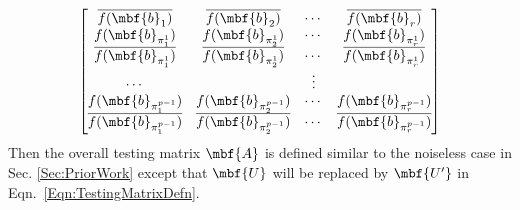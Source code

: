 \documentclass[conference,twocolumn]{IEEEtran}
\begin{document}
{\begin{align}
\begin{bmatrix}
\overline{f(\mbf{b}_1)} & \overline{f(\mbf{b}_2)} & \cdots & \overline{f(\mbf{b}_r)}\\
f(\mbf{b}_{\pi^{1}_{1}}) & f(\mbf{b}_{\pi^{1}_{2}}) & \cdots & f(\mbf{b}_{\pi^{1}_{r}})\\
\overline{f(\mbf{b}_{\pi^{1}_{1}})} & \overline{f(\mbf{b}_{\pi^{1}_{2}})} & \cdots & \overline{f(\mbf{b}_{\pi^{1}_{r}})}\\
\cdots &  &\vdots \\
f(\mbf{b}_{\pi^{p-1}_{1}}) & f(\mbf{b}_{\pi^{p-1}_{2}}) & \cdots & f(\mbf{b}_{\pi^{p-1}_{r}})\\
\overline{f(\mbf{b}_{\pi^{p-1}_{1}})} & \overline{f(\mbf{b}_{\pi^{p-1}_{2}})} & \cdots & \overline{f(\mbf{b}_{\pi^{p-1}_{r}})}\\
\end{bmatrix}
\end{align}
Then the overall testing matrix $\mbf{A}$ is defined similar to the noiseless case in Sec. \ref{Sec:PriorWork} except that $\mbf{U}$ will be replaced by $\mbf{U'}$ in Eqn.~\eqref{Eqn:TestingMatrixDefn}.  %

}
\end{document}
